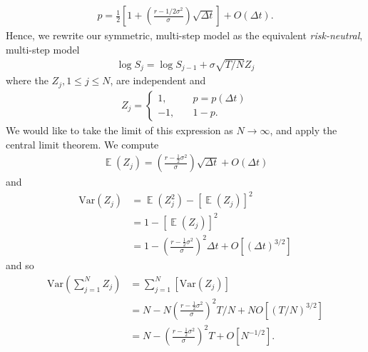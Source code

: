 \documentclass[12pt]{amsbook}
\DeclareMathOperator{\ex}{\mathbb{E}}
\newcommand{\var}{\mathrm{Var}}
\theoremstyle{plain}
\theoremstyle{definition}
\theoremstyle{remark}
\numberwithin{equation}{section}  %
\begin{document}
	\begin{equation*}
		\begin{split}
			p = \frac{1}{2} \left[ 1 + \left( \frac{r - 1/2 \sigma^{2}}{\sigma}
			\right)\sqrt{\Delta t} \right]  + O(\Delta t).
		\end{split}
	\end{equation*}
	Hence, we rewrite our symmetric, multi-step model as the
	equivalent \emph{risk-neutral}, multi-step model
	\begin{equation*}
		\begin{split}
			\log S_{j} = \log S_{j-1} + \sigma \sqrt{T/N} Z_{j}
		\end{split}
	\end{equation*}
	where the $Z_{j}, 1 \le j \le N$, are independent and 
	\begin{equation*}
		\begin{split}
			Z_{j} = \begin{cases}
				1, \quad & p = p(\Delta t) \\
				-1, \quad & 1-p.
			\end{cases}
		\end{split}
	\end{equation*}
	We would like to take the limit of this expression as $N \to \infty$,
	and apply the central limit theorem. We compute
	\begin{equation*}
		\begin{split}
			\ex(Z_{j}) = \left( \frac{r - \frac{1}{2} \sigma^{2}}{\sigma}
			\right)\sqrt{\Delta t}  + O(\Delta t)
		\end{split}
	\end{equation*}
	and
	\begin{equation*}
		\begin{split}
			\var (Z_{j}) & = \ex(Z_{j}^2) - {[\ex(Z_{j})]}^{2} 
			\\
			& = 1 - {[\ex(Z_{j})]}^{2} 
			\\
			& = 1 - {\left( \frac{r - \frac{1}{2} \sigma^{2}}{\sigma}
		\right)}^{2}
		\Delta t  + O[{(\Delta t)}^{3/2}]
	\end{split}
\end{equation*}
and so
\begin{equation*}
	\begin{split}
		\var(\sum_{j=1}^{N} Z_{j}) 
		& = \sum_{j=1}^{N}[\var(Z_{j})]
		\\
		& = N - N {\left( \frac{r - \frac{1}{2} \sigma^{2}}{\sigma}
	\right)}^{2}
	T/N  + N O[{(T/N)}^{3/2}]
	\\
	& = N - {\left( \frac{r - \frac{1}{2} \sigma^{2}}{\sigma}
\right)}^{2}
T  + O[N^{-1/2}].
	\end{split}
\end{equation*}
\end{document}
